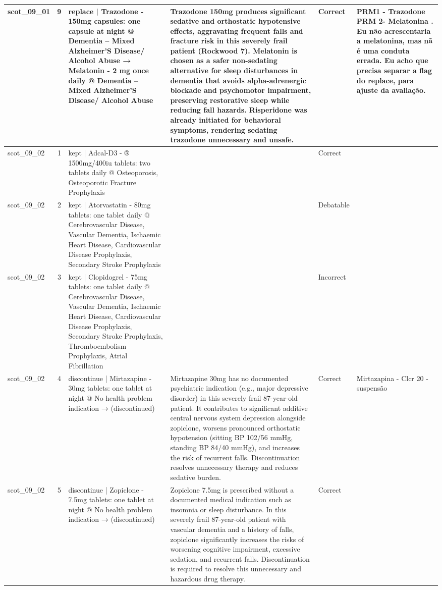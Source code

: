 \begin{longtable}{|p{1.45cm}|c|p{3.3cm}|p{6.5cm}|p{1.55cm}|p{2.3cm}|}
\hline
scot\_09\_01 & 9 & replace | Trazodone - 150mg capsules: one capsule at night @ Dementia – Mixed Alzheimer’S Disease/ Alcohol Abuse → Melatonin - 2 mg once daily @ Dementia – Mixed Alzheimer’S Disease/ Alcohol Abuse & Trazodone 150mg produces significant sedative and orthostatic hypotensive effects, aggravating frequent falls and fracture risk in this severely frail patient (Rockwood 7). Melatonin is chosen as a safer non-sedating alternative for sleep disturbances in dementia that avoids alpha-adrenergic blockade and psychomotor impairment, preserving restorative sleep while reducing fall hazards. Risperidone was already initiated for behavioral symptoms, rendering sedating trazodone unnecessary and unsafe. & Correct & PRM1 - Trazodone PRM 2- Melatonina . Eu não acrescentaria a melatonina, mas nã é uma conduta errada. Eu acho que precisa separar a flag do replace, para ajuste da avaliação. \\
\hline
scot\_09\_02 & 1 & kept | Adcal-D3 - ® 1500mg/400iu tablets: two tablets daily @ Osteoporosis, Osteoporotic Fracture Prophylaxis &  & Correct &  \\
\hline
scot\_09\_02 & 2 & kept | Atorvastatin - 80mg tablets: one tablet daily @ Cerebrovascular Disease, Vascular Dementia, Ischaemic Heart Disease, Cardiovascular Disease Prophylaxis, Secondary Stroke Prophylaxis &  & Debatable &  \\
\hline
scot\_09\_02 & 3 & kept | Clopidogrel - 75mg tablets: one tablet daily @ Cerebrovascular Disease, Vascular Dementia, Ischaemic Heart Disease, Cardiovascular Disease Prophylaxis, Secondary Stroke Prophylaxis, Thromboembolism Prophylaxis, Atrial Fibrillation &  & Incorrect &  \\
\hline
scot\_09\_02 & 4 & discontinue | Mirtazapine - 30mg tablets: one tablet at night @ No health problem indication → (discontinued) & Mirtazapine 30mg has no documented psychiatric indication (e.g., major depressive disorder) in this severely frail 87-year-old patient. It contributes to significant additive central nervous system depression alongside zopiclone, worsens pronounced orthostatic hypotension (sitting BP 102/56 mmHg, standing BP 84/40 mmHg), and increases the risk of recurrent falls. Discontinuation resolves unnecessary therapy and reduces sedative burden. & Correct & Mirtazapina - Clcr 20 - suspensão \\
\hline
scot\_09\_02 & 5 & discontinue | Zopiclone - 7.5mg tablets: one tablet at night @ No health problem indication → (discontinued) & Zopiclone 7.5mg is prescribed without a documented medical indication such as insomnia or sleep disturbance. In this severely frail 87-year-old patient with vascular dementia and a history of falls, zopiclone significantly increases the risks of worsening cognitive impairment, excessive sedation, and recurrent falls. Discontinuation is required to resolve this unnecessary and hazardous drug therapy. & Correct &  \\

\end{longtable}
